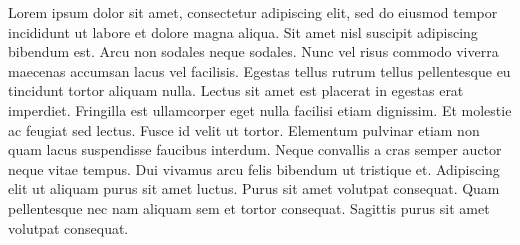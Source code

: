 Lorem ipsum dolor sit amet, consectetur adipiscing elit, sed do eiusmod tempor incididunt ut labore et dolore magna aliqua. Sit amet nisl suscipit adipiscing bibendum est. Arcu non sodales neque sodales. Nunc vel risus commodo viverra maecenas accumsan lacus vel facilisis. Egestas tellus rutrum tellus pellentesque eu tincidunt tortor aliquam nulla. Lectus sit amet est placerat in egestas erat imperdiet. Fringilla est ullamcorper eget nulla facilisi etiam dignissim. Et molestie ac feugiat sed lectus. Fusce id velit ut tortor. Elementum pulvinar etiam non quam lacus suspendisse faucibus interdum. Neque convallis a cras semper auctor neque vitae tempus. Dui vivamus arcu felis bibendum ut tristique et. Adipiscing elit ut aliquam purus sit amet luctus. Purus sit amet volutpat consequat. Quam pellentesque nec nam aliquam sem et tortor consequat. Sagittis purus sit amet volutpat consequat.